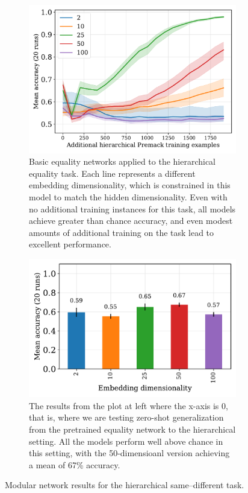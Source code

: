 \documentclass{article}
\newcommand{\update}[1]{{\color{darkblue}#1}}
\begin{document}
\begin{figure}[tp]
  \centering
  \begin{subfigure}[t]{0.48\textwidth}
  \includegraphics[width=1\linewidth]{../fig/input-as-output-train_size-embed_dim-hidden_dim=0.pdf}
  \caption{Basic equality networks applied to the hierarchical equality task. Each line represents a different embedding dimensionality, which is constrained in this model to match the hidden dimensionality. Even with no additional training instances for this task, all models achieve greater than chance accuracy, and even modest amounts of additional training on the task lead to excellent performance.
  }
  \label{fig:premack-pretraining-results}
  \end{subfigure}
  \hfill
  \begin{subfigure}[t]{0.48\textwidth}
    \centering
    \includegraphics[width=1\linewidth]{../fig/input-as-output-zero-shot.pdf}
    \caption{\update{The results from the plot at left where the x-axis is 0, that is, where we are testing zero-shot generalization from the pretrained equality network to the hierarchical setting. All the models perform well above chance in this setting, with the 50-dimensioanl version achieving a mean of 67\% accuracy.}}
    \label{fig:premack-pretraining-zero-shot-results}
  \end{subfigure}
  \caption{Modular network results for the hierarchical same--different task.}
  \label{fig:modular-results}
\end{figure}
\end{document}
